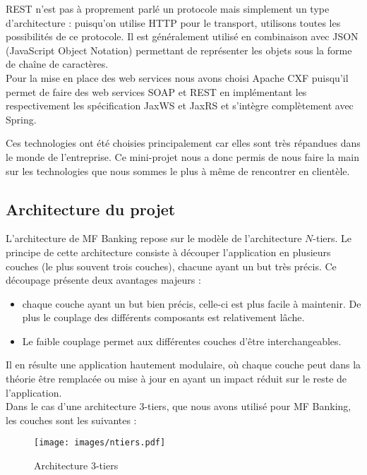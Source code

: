 REST n'est pas à proprement parlé un protocole mais simplement un type d'architecture : puisqu'on utilise HTTP pour le transport, utilisons toutes les possibilités de ce protocole. Il est généralement utilisé en combinaison avec JSON (JavaScript Object Notation) permettant de représenter les objets sous la forme de chaîne de caractères.\\

Pour la mise en place des web services nous avons choisi Apache CXF puisqu'il permet de faire des web services SOAP et REST en implémentant les respectivement les spécification JaxWS et JaxRS et s'intègre complètement avec Spring.

Ces technologies ont été choisies principalement car elles sont très répandues dans le monde de l'entreprise. Ce mini-projet nous a donc permis de nous faire la main sur les technologies que nous sommes le plus à même de rencontrer en clientèle.

\subsection{Architecture du projet}

L'architecture de MF Banking repose sur le modèle de l'architecture $N$-tiers.
Le principe de cette architecture consiste à découper l'application en plusieurs couches (le plus souvent trois couches), chacune ayant un but très précis. Ce découpage présente deux avantages majeurs :

\begin{itemize}
	\item chaque couche ayant un but bien précis, celle-ci est plus facile à maintenir. De plus le couplage des différents composants est relativement lâche. 
	\item Le faible couplage permet aux différentes couches d'\^{e}tre interchangeables.
\end{itemize}

Il en résulte une application hautement modulaire, où chaque couche peut dans la théorie être remplacée ou mise à jour en ayant un impact réduit sur le reste de l'application.\\

Dans le cas d'une architecture 3-tiers, que nous avons utilisé pour MF Banking, les  couches sont les suivantes :

\begin{figure} [h!]
	\centering
		\texttt{[image: images/ntiers.pdf]}
	\caption{Architecture 3-tiers}
\end{figure}

